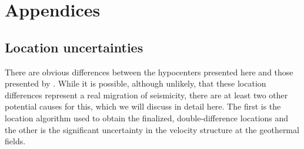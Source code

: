 \section{Appendices}
\subsection{Location uncertainties}\label{App1}
There are obvious differences between the hypocenters presented here and those presented by \citet{Sherburn_2015,Sewell_2015WGC}. While it is possible, although unlikely, that these location differences represent a real migration of seismicity, there are at least two other potential causes for this, which we will discuss in detail here. The first is the location algorithm used to obtain the finalized, double-difference locations and the other is the significant uncertainty in the velocity structure at the geothermal fields.

